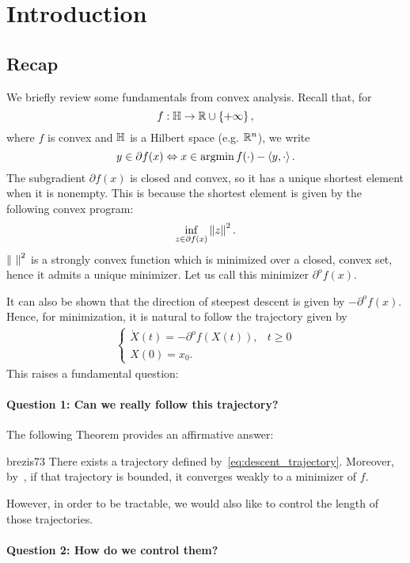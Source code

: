 \section{Introduction}

\subsection{Recap}
We briefly review some fundamentals from convex analysis. Recall that, for
\[
	f : \mathbb{H} \to \mathbb{R} \cup \left\{ +\infty \right\},
\]
where $f$ is convex and $\mathbb{H}$ is a Hilbert space (e.g. $\mathbb{R}^n$), we write
\[
	y \in \partial f(x) \Leftrightarrow x \in \operatorname*{argmin} f(\cdot) - \left\langle y, \cdot \right\rangle.
\]
The subgradient $\partial f(x)$ is closed and convex, so it has a unique
shortest element when it is nonempty. This is because the shortest element is
given by the following convex program:
\[
	\inf_{z \in \partial f(x)} \left \| z \right \|^2.
\]
$\left \| ~ \right \|^2$ is a strongly convex function which is minimized over a closed,
convex set, hence it admits a unique minimizer. Let us call this minimizer
$\partial^o f(x)$.

It can also be shown that the direction of steepest descent is given by
$-\partial^o f(x)$. Hence, for minimization, it is natural to follow the
trajectory given by
\begin{align}
	\begin{cases}
		\dot{X}(t) = -\partial^o f(X(t)), & t \geq 0 \\
		X(0) = x_0. &
	\end{cases}
	\label{eq:descent_trajectory}
\end{align}
This raises a fundamental question:

\paragraph{Question 1: Can we really follow this trajectory?}

The following Theorem provides an affirmative answer:

\begin{ctheorem}{\cite{Brezis73}}{brezis73}
	There exists a trajectory defined by~\cref{eq:descent_trajectory}.
	Moreover, by~\cite{Bruck75}, if that trajectory is bounded, it converges
	weakly to a minimizer of $f$.
\end{ctheorem}

However, in order to be tractable, we would also like to control the length of
those trajectories.

\paragraph{Question 2: How do we control them?}

